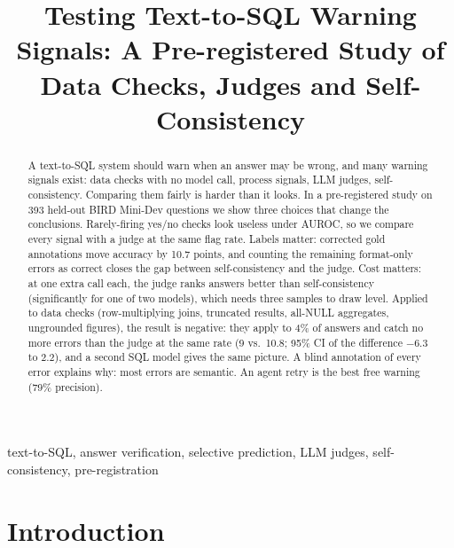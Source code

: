 \documentclass[conference]{IEEEtran}
\begin{document}
\title{Testing Text-to-SQL Warning Signals: A Pre-registered Study of Data Checks, Judges and Self-Consistency}

\author{
}

\maketitle

\begin{abstract}
A text-to-SQL system should warn when an answer may be wrong, and many warning signals exist: data
checks with no model call, process signals, LLM judges, self-consistency. Comparing them fairly is
harder than it looks. In a pre-registered study on 393 held-out BIRD Mini-Dev questions we show three
choices that change the conclusions. Rarely-firing yes/no checks look useless under AUROC, so we
compare every signal with a judge at the same flag rate. Labels matter: corrected gold annotations
move accuracy by 10.7 points, and counting the remaining format-only errors as correct closes the
gap between self-consistency and the judge. Cost matters: at one extra call each, the judge ranks answers
better than self-consistency (significantly for one of two models), which needs three samples to
draw level. Applied to data checks (row-multiplying
joins, truncated results, all-NULL aggregates, ungrounded figures), the result is negative: they apply
to 4\% of answers and catch no more errors than the judge at the same rate (9 vs.\ 10.8; 95\% CI of
the difference $-6.3$ to $2.2$), and a second SQL model gives the same picture. A blind annotation of
every error explains why: most errors are semantic. An agent retry is the best free warning (79\%
precision).
\end{abstract}

\begin{IEEEkeywords}
text-to-SQL, answer verification, selective prediction, LLM judges, self-consistency, pre-registration
\end{IEEEkeywords}

\section{Introduction}
\end{document}
